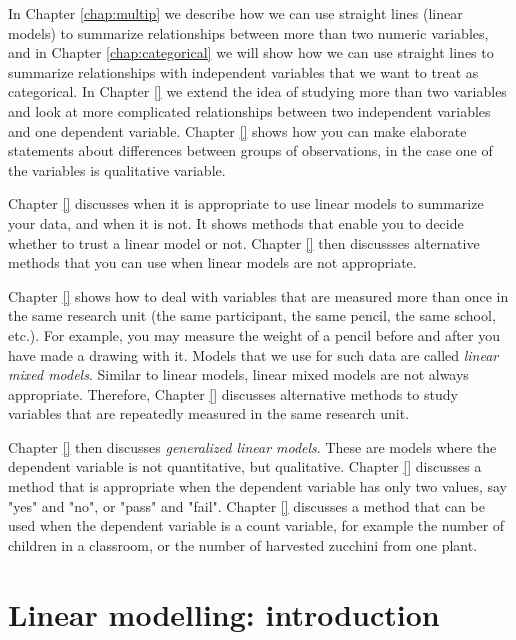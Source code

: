 \documentclass[]{report}\usepackage[]{graphicx}\usepackage[]{color}
\begin{document}
In Chapter \ref{chap:multip} we describe how we can use straight lines (linear models) to summarize relationships between more than two numeric variables, and in Chapter \ref{chap:categorical} we will show how we can use straight lines to summarize relationships with independent variables that we want to treat as categorical. In Chapter \ref{} we extend the idea of studying more than two variables and look at more complicated relationships between two independent variables and one dependent variable. Chapter \ref{} shows how you can make elaborate statements about differences between groups of observations, in the case one of the variables is qualitative variable.

Chapter \ref{} discusses when it is appropriate to use linear models to summarize your data, and when it is not. It shows methods that enable you to decide whether to trust a linear model or not. Chapter \ref{} then discussses alternative methods that you can use when linear models are not appropriate.

Chapter \ref{} shows how to deal with variables that are measured more than once in the same research unit (the same participant, the same pencil, the same school, etc.). For example, you may measure the weight of a pencil before and after you have made a drawing with it. Models that we use for such data are called \textit{linear mixed models}. Similar to linear models, linear mixed models are not always appropriate. Therefore, Chapter \ref{} discusses alternative methods to study variables that are repeatedly measured in the same research unit.

Chapter \ref{} then discusses \textit{generalized linear models}. These are models where the dependent variable is not quantitative, but qualitative. Chapter \ref{} discusses a method that is appropriate when the dependent variable has only two values, say "yes" and "no", or "pass" and "fail". Chapter \ref{} discusses a method that can be used when the dependent variable is a count variable, for example the number of children in a classroom, or the number of harvested zucchini from one plant.













\chapter{Linear modelling: introduction}\label{chap:simple}
\end{document}
